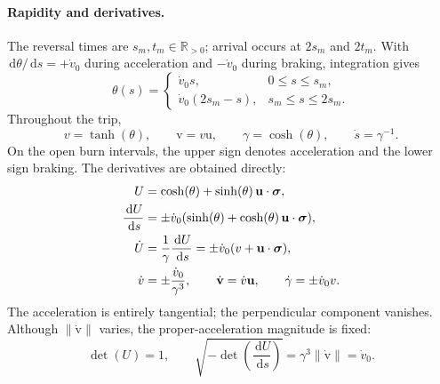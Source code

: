 \documentclass[11pt]{article}
\newcommand{\pv}[1]{{#1}}
\newcommand{\vstyle}[1]{{\bm{\mathrm{#1}}}}
\newcommand{\pU}{\pv{U}}
\numberwithin{equation}{section}
\newcommand{\R}{\mathbb{R}}
\newcommand{\dotprod}{\cdot}
\newcommand{\bsig}{\vstyle{\sigma}}
\newcommand{\bv}{\vstyle{v}}
\newcommand{\bu}{\vstyle{u}}
\newcommand{\dd}{\,\mathrm d}
\begin{document}
\paragraph{Rapidity and derivatives.}
The reversal times are $s_m,t_m\in\R_{>0}$; arrival occurs at
$2s_m$ and $2t_m$. With $\dd\theta/\dd s=+\dot v_0$ during acceleration
and $-\dot v_0$ during braking, integration gives
\begin{equation}
 \theta(s)=\begin{cases}
  \dot v_0s,&0\le s\le s_m,\\
  \dot v_0(2s_m-s),&s_m\le s\le2s_m.
 \end{cases}
 \label{eq:rocket-rapidity}
\end{equation}
Throughout the trip,
\[
 v=\tanh(\theta),\qquad \bv=v\bu,\qquad
 \gamma=\cosh(\theta),\qquad \dot s=\gamma^{-1}.
\]
On the open burn intervals, the upper sign denotes acceleration and the
lower sign braking. The derivatives are obtained directly:
\begin{align}
 \pU&=\cosh(\theta)+\sinh(\theta)\,\bu\dotprod\bsig,\notag\\
 \frac{\dd\pU}{\dd s}
 &=\pm\dot v_0(\sinh(\theta)+\cosh(\theta)\,\bu\dotprod\bsig),\notag\\
 \dot\pU&=\frac{1}{\gamma}\frac{\dd\pU}{\dd s}
 =\pm\dot v_0(v+\bu\dotprod\bsig),\notag\\
 \dot v&=\pm\frac{\dot v_0}{\gamma^3},\qquad
 \dot{\bv}=\dot v\bu,\qquad
 \dot\gamma=\pm\dot v_0v.
 \label{eq:rocket-derivatives}
\end{align}
The acceleration is entirely tangential; the perpendicular component
vanishes. Although $\lVert\dot{\bv}\rVert$ varies, the proper-acceleration
magnitude is fixed:
\[
 \det(\pU)=1,\qquad
 \sqrt{-\det\left(\frac{\dd\pU}{\dd s}\right)}
 =\gamma^3\lVert\dot{\bv}\rVert=\dot v_0.
\]
\end{document}

